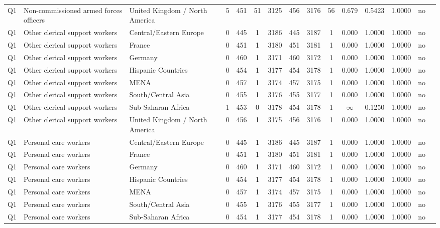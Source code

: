 \begin{longtable}{lllrcccccccccll}
Q1 & Non-commissioned armed forces officers & United Kingdom / North America & 5 & 451 & 51 & 3125 & 456 & 3176 & 56 & 0.679 & 0.5423 & 1.0000 & no \\
Q1 & Other clerical support workers & Central/Eastern Europe & 0 & 445 & 1 & 3186 & 445 & 3187 & 1 & 0.000 & 1.0000 & 1.0000 & no \\
Q1 & Other clerical support workers & France & 0 & 451 & 1 & 3180 & 451 & 3181 & 1 & 0.000 & 1.0000 & 1.0000 & no \\
Q1 & Other clerical support workers & Germany & 0 & 460 & 1 & 3171 & 460 & 3172 & 1 & 0.000 & 1.0000 & 1.0000 & no \\
Q1 & Other clerical support workers & Hispanic Countries & 0 & 454 & 1 & 3177 & 454 & 3178 & 1 & 0.000 & 1.0000 & 1.0000 & no \\
Q1 & Other clerical support workers & MENA & 0 & 457 & 1 & 3174 & 457 & 3175 & 1 & 0.000 & 1.0000 & 1.0000 & no \\
Q1 & Other clerical support workers & South/Central Asia & 0 & 455 & 1 & 3176 & 455 & 3177 & 1 & 0.000 & 1.0000 & 1.0000 & no \\
Q1 & Other clerical support workers & Sub-Saharan Africa & 1 & 453 & 0 & 3178 & 454 & 3178 & 1 & $\infty$ & 0.1250 & 1.0000 & no \\
Q1 & Other clerical support workers & United Kingdom / North America & 0 & 456 & 1 & 3175 & 456 & 3176 & 1 & 0.000 & 1.0000 & 1.0000 & no \\
Q1 & Personal care workers & Central/Eastern Europe & 0 & 445 & 1 & 3186 & 445 & 3187 & 1 & 0.000 & 1.0000 & 1.0000 & no \\
Q1 & Personal care workers & France & 0 & 451 & 1 & 3180 & 451 & 3181 & 1 & 0.000 & 1.0000 & 1.0000 & no \\
Q1 & Personal care workers & Germany & 0 & 460 & 1 & 3171 & 460 & 3172 & 1 & 0.000 & 1.0000 & 1.0000 & no \\
Q1 & Personal care workers & Hispanic Countries & 0 & 454 & 1 & 3177 & 454 & 3178 & 1 & 0.000 & 1.0000 & 1.0000 & no \\
Q1 & Personal care workers & MENA & 0 & 457 & 1 & 3174 & 457 & 3175 & 1 & 0.000 & 1.0000 & 1.0000 & no \\
Q1 & Personal care workers & South/Central Asia & 0 & 455 & 1 & 3176 & 455 & 3177 & 1 & 0.000 & 1.0000 & 1.0000 & no \\
Q1 & Personal care workers & Sub-Saharan Africa & 0 & 454 & 1 & 3177 & 454 & 3178 & 1 & 0.000 & 1.0000 & 1.0000 & no \\

\end{longtable}
